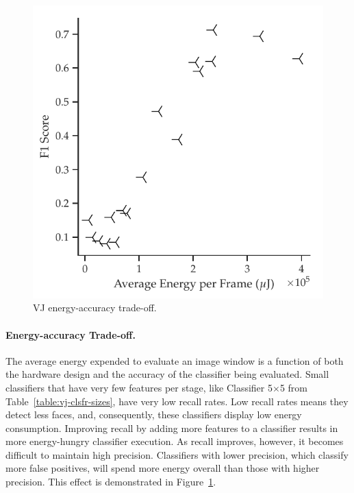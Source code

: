 \begin{figure}
\includegraphics[width=\textwidth]{nsp-figs/eval_vj_energ_acc2.pdf}
    \caption{VJ energy-accuracy trade-off.}
    \label{fig:vj-tradeoff}
\end{figure}

\paragraph{Energy-accuracy Trade-off.} The average energy expended to evaluate an image window
is a function of both the hardware design and the accuracy of the classifier being evaluated.
Small classifiers that have very few features per stage, like Classifier 5$\times$5 from
Table~\ref{table:vj-clsfr-sizes}, have very low recall rates. Low recall rates means they detect less
faces, and, consequently, these classifiers display low energy consumption. Improving recall by
adding more features to a classifier results in more energy-hungry classifier execution. As recall
improves, however, it becomes difficult to maintain high precision. Classifiers with lower precision,
which classify more false positives, will spend more energy overall than those with higher precision.
This effect is demonstrated in Figure~\ref{fig:vj-tradeoff}.


